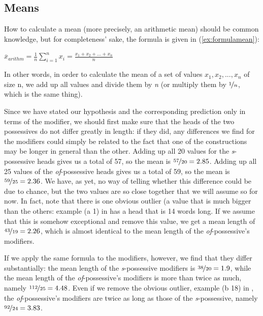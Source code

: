 \subsection{Means}
\label{sec:means}

How to calculate a mean  (more precisely, an arithmetic mean) should be common knowledge, but for completeness' sake, the formula is given in (\ref{ex:formulamean}):

\begin{exe}
\ex $\displaystyle{\overline{x}_{arithm} = \frac{1}{n}\sum _{i=1}^nx_i = \frac{x_1+x_2+...+x_n}{n}}$
\label{ex:formulamean}
\end{exe}

In other words, in order to calculate the mean  of a set of values $x_1, x_2, ..., x_n$ of size n, we add up all values and divide them by \textit{n} (or multiply them by $\nicefrac{1}{n}$, which is the same thing).

Since we have stated our hypothesis  and the corresponding prediction only in terms of the modifier, we should first make sure that the heads of the two possessives  do not differ greatly in length:  if they did, any differences we find for the modifiers could simply be related to the fact that one of the constructions may be longer in general than the other. Adding up all 20 values for the \textit{s}-possessive heads gives us a total of 57, so the mean  is $\nicefrac{57}{20} = 2.85$. Adding up all 25 values of the \textit{of}-possessive heads gives us a total of 59, so the mean is $\nicefrac{59}{25} = 2.36$. We have, as yet, no way of telling whether this difference could be due to chance,  but the two values are so close together that we will assume so for now. In fact, note that there is one obvious outlier (a value that is much bigger than the others: example (a 1) in  has a head that is 14 words long. If we assume that this is somehow exceptional and remove this value, we get a mean  length  of $\nicefrac{43}{19} = 2.26$, which is almost identical to the mean length of the \textit{of}-possessive's  modifiers.

If we apply the same formula to the modifiers, however, we find that they differ substantially: the mean  length  of the \textit{s}-possessive  modifiers is $\nicefrac{38}{20} = 1.9$, while the mean length of the \textit{of}-possessive's modifiers is more than twice as much, namely $\nicefrac{112}{25} = 4.48$. Even if we remove the obvious outlier, example (b 18) in , the \textit{of}-possessive's modifiers are twice as long as those of the \textit{s}-possessive, namely $\nicefrac{92}{24} = 3.83$.

